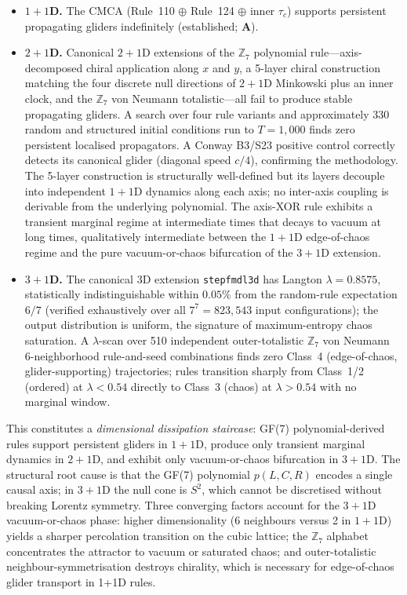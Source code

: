 \documentclass[11pt]{article}
\theoremstyle{remark}
\newcommand{\ZS}{\mathbb{Z}_7}
\newcommand{\lean}[1]{%
  \penalty-100
  \begingroup\def\_{\textunderscore\allowbreak}\texttt{#1}\endgroup}
\newcommand{\CatA}{\textbf{A}}
\begin{document}
\begin{itemize}[noitemsep]
  \item \textbf{$1+1$D.}  The CMCA (Rule~110 $\oplus$ Rule~124 $\oplus$ inner
    $\tau_c$) supports persistent propagating gliders indefinitely
    (established; \CatA{}).
  \item \textbf{$2+1$D.}  Canonical $2+1$D extensions of the $\ZS$ polynomial
    rule---axis-decomposed chiral application along $x$ and $y$, a 5-layer
    chiral construction matching the four discrete null directions of $2+1$D
    Minkowski plus an inner clock, and the $\ZS$ von Neumann
    totalistic---all fail to produce stable propagating gliders.
    A search over four rule variants and approximately 330 random and
    structured initial conditions run to $T=1{,}000$ finds zero persistent
    localised propagators.  A Conway B3/S23 positive control correctly
    detects its canonical glider (diagonal speed $c/4$), confirming the
    methodology.  The 5-layer construction is structurally well-defined but
    its layers decouple into independent $1+1$D dynamics along each axis;
    no inter-axis coupling is derivable from the underlying polynomial.
    The axis-XOR rule exhibits a transient marginal regime at intermediate
    times that decays to vacuum at long times, qualitatively intermediate
    between the $1+1$D edge-of-chaos regime and the pure vacuum-or-chaos
    bifurcation of the $3+1$D extension.
  \item \textbf{$3+1$D.}  The canonical 3D extension \lean{step\_fmdl3d}
    has Langton $\lambda=0.8575$, statistically indistinguishable within
    $0.05\%$ from the random-rule expectation $6/7$ (verified exhaustively
    over all $7^7=823{,}543$ input configurations); the output distribution
    is uniform, the signature of maximum-entropy chaos saturation.
    A $\lambda$-scan over 510 independent outer-totalistic $\ZS$ von Neumann
    6-neighborhood rule-and-seed combinations finds zero Class~4
    (edge-of-chaos, glider-supporting) trajectories; rules transition
    sharply from Class~1/2 (ordered) at $\lambda<0.54$ directly to
    Class~3 (chaos) at $\lambda>0.54$ with no marginal window.
\end{itemize}
This constitutes a \emph{dimensional dissipation staircase}: GF(7)
polynomial-derived rules support persistent gliders in $1+1$D, produce
only transient marginal dynamics in $2+1$D, and exhibit only
vacuum-or-chaos bifurcation in $3+1$D.  The structural root cause is that
the GF(7) polynomial $p(L,C,R)$ encodes a single causal axis; in $3+1$D
the null cone is $S^2$, which cannot be discretised without breaking
Lorentz symmetry.  Three converging factors account for the $3+1$D
vacuum-or-chaos phase: higher dimensionality (6 neighbours versus 2 in
$1+1$D) yields a sharper percolation transition on the cubic lattice; the
$\ZS$ alphabet concentrates the attractor to vacuum or saturated chaos;
and outer-totalistic neighbour-symmetrisation destroys chirality, which
is necessary for edge-of-chaos glider transport in 1+1D rules.
\end{document}
